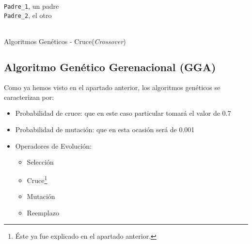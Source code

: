 \documentclass[a4paper, 11pt]{article}
\begin{document}
			\begin{algorithm}[H]
				\begin{algorithmic}[1]
				\REQUIRE \ \\
						\texttt{Padre\_1}, un padre \\
						\texttt{Padre\_2}, el otro \\ \
						
				
				\ENDWHILE
				
				\ENDIF
				
					\ELSE
					\ENDIF
				\ENDFOR
				
				\end{algorithmic}
			\caption{Algoritmos Genéticos - Cruce(\textit{Crossover})}
			\label{GA-Cross}
			\end{algorithm}
			
		\subsection{Algoritmo Genético Gerenacional (\textbf{GGA})}
			Como ya hemos visto en el apartado anterior, los algoritmos genéticos se caracterizan por:
			
			\begin{itemize}
				\item Probabilidad de cruce: que en este caso particular tomará el valor de 0.7
				\item Probabilidad de mutación: que en esta ocasión será de 0.001
				\item Operadores de Evolución:
				\begin{itemize}
					\item Selección
					\item Cruce\footnote{Éste ya fue explicado en el apartado anterior.}
					\item Mutación
					\item Reemplazo
				\end{itemize}
			\end{itemize}
			
\end{document}

